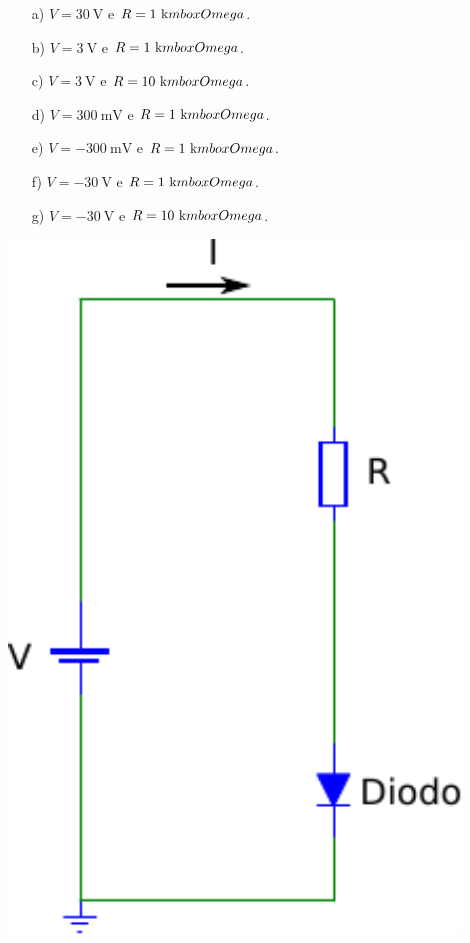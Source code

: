 \documentclass[main.tex]{subfiles}
\begin{document}
\begin{minipage}[l]{0.6\linewidth}
\begin{itemize}
\item[a)] $V=30~\mbox{V}$ e $R=1~\mbox{k}\\mbox{Omega}$.
\item[b)] $V=3~\mbox{V}$ e $R=1~\mbox{k}\\mbox{Omega}$.
\item[c)] $V=3~\mbox{V}$ e $R=10~\mbox{k}\\mbox{Omega}$.
\item[d)] $V=300~\mbox{mV}$ e $R=1~\mbox{k}\\mbox{Omega}$.
\item[e)] $V=-300~\mbox{mV}$ e $R=1~\mbox{k}\\mbox{Omega}$.
\item[f)] $V=-30~\mbox{V}$ e $R=1~\mbox{k}\\mbox{Omega}$.
\item[g)] $V=-30~\mbox{V}$ e $R=10~\mbox{k}\\mbox{Omega}$.
\end{itemize}\end{minipage}\begin{minipage}[c]{0.4\linewidth}
\includegraphics[width=0.9\textwidth]{./cap_equacao1d/pics/circuito_diodo}
\end{minipage}\\
\end{document}
